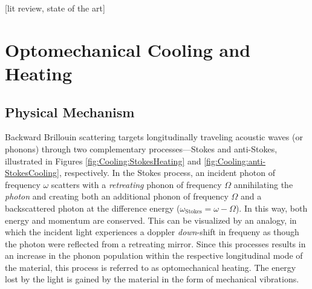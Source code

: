 [lit review, state of the art]


\section{Optomechanical Cooling and Heating}
\label{Cooling:sec:CoolingandHeating}

\subsection{Physical Mechanism}
\label{Cooling:subsec:PhysicalMechanism}

Backward Brillouin scattering targets longitudinally traveling acoustic waves (or phonons) through two complementary processes---Stokes and anti-Stokes, illustrated in Figures \ref{fig:Cooling:StokesHeating} and \ref{fig:Cooling:anti-StokesCooling}, respectively. In the Stokes process, an incident photon of frequency \(\omega\) scatters with a \textit{retreating} phonon of frequency \(\Omega\) annihilating the \textit{photon} and creating both an additional phonon of frequency \(\Omega\) and a backscattered photon at the difference energy (\(\omega_{\mathrm{Stokes}} = \omega - \Omega\)). In this way, both energy and momentum are conserved. This can be visualized by an analogy, in which the incident light experiences a doppler \textit{down}-shift in frequeny as though the photon were reflected from a retreating mirror. Since this processes results in an increase in the phonon population within the respective longitudinal mode of the material, this process is referred to as optomechanical heating. The energy lost by the light is gained by the material in the form of mechanical vibrations.

